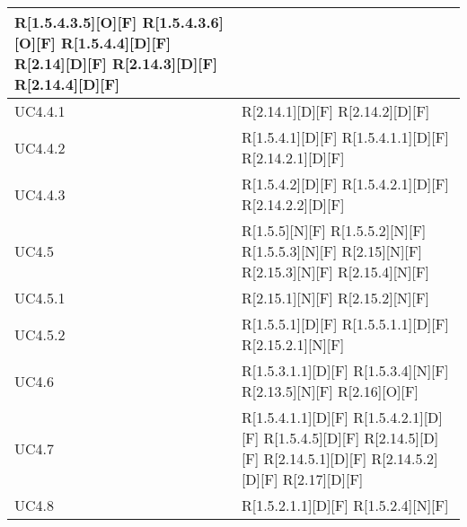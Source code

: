 \begin{longtable}{X | X}
R[1.5.4.3.5][O][F] \newline
R[1.5.4.3.6][O][F] \newline
R[1.5.4.4][D][F] \newline
R[2.14][D][F] \newline
R[2.14.3][D][F] \newline
R[2.14.4][D][F]  \\
\hline
UC4.4.1 & R[2.14.1][D][F] \newline
R[2.14.2][D][F]  \\
\hline
UC4.4.2 & R[1.5.4.1][D][F] \newline
R[1.5.4.1.1][D][F] \newline
R[2.14.2.1][D][F]  \\
\hline
UC4.4.3 & R[1.5.4.2][D][F] \newline
R[1.5.4.2.1][D][F] \newline
R[2.14.2.2][D][F]  \\
\hline
UC4.5 & R[1.5.5][N][F] \newline
R[1.5.5.2][N][F] \newline
R[1.5.5.3][N][F] \newline
R[2.15][N][F] \newline
R[2.15.3][N][F] \newline
R[2.15.4][N][F]  \\
\hline
UC4.5.1 & R[2.15.1][N][F] \newline
R[2.15.2][N][F]  \\
\hline
UC4.5.2 & R[1.5.5.1][D][F] \newline
R[1.5.5.1.1][D][F] \newline
R[2.15.2.1][N][F]  \\
\hline
UC4.6 & R[1.5.3.1.1][D][F] \newline
R[1.5.3.4][N][F] \newline
R[2.13.5][N][F] \newline
R[2.16][O][F]  \\
\hline
UC4.7 & R[1.5.4.1.1][D][F] \newline
R[1.5.4.2.1][D][F] \newline
R[1.5.4.5][D][F] \newline
R[2.14.5][D][F] \newline
R[2.14.5.1][D][F] \newline
R[2.14.5.2][D][F] \newline
R[2.17][D][F]  \\
\hline
UC4.8 & R[1.5.2.1.1][D][F] \newline
R[1.5.2.4][N][F] \newline

\end{longtable}
